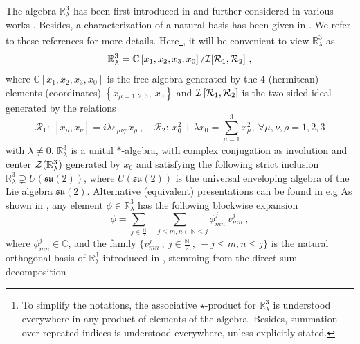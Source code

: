 \documentclass[10pt]{book}
\theoremstyle{break}
\begin{document}
The algebra $\mathbb{R}^3_\lambda$ has been first introduced in %
and further considered in various works %
. Besides, a characterization of a natural basis has been given in %
. We refer to these references for more details. Here{\footnote{To simplify the notations, the associative $\star$-product for $\mathbb{R}^3_\lambda$ is understood everywhere in any product of elements of the algebra. Besides, summation over repeated indices is understood everywhere, unless explicitly stated.}}, it will be convenient to view $\mathbb{R}^3_\lambda$ as %
%
\begin{equation}
\mathbb{R}^3_\lambda=\mathbb{C}\left[x_1,x_2,x_3,x_0\right]/{\mathcal{I}}[{\mathcal{R}}_1,{\cal{R}}_2] \ , %
\end{equation}
%
where $\mathbb{C}\left[x_1,x_2,x_3,x_0\right]$ is the free algebra generated by the 4 (hermitean) elements (coordinates) $\left\{x_{\mu=1,2,3},\ x_0\right\}$ and ${\mathcal{I}}\left[{\mathcal{R}}_1,{\cal{R}}_2\right]$ is the two-sided ideal generated by the relations%
%
\begin{equation}
{\mathcal{R}}_1: \ [x_\mu,x_\nu] = i \lambda \varepsilon_{\mu\nu\rho} x_\rho \ , \quad
{\mathcal{R}}_2: \ x_0^2 + \lambda x_0 = \sum_{\mu=1}^3 x_\mu^2,\ \forall \mu,\nu,\rho=1,2,3%
\end{equation}
%
with $\lambda\ne0$. $\mathbb{R}^3_\lambda$ is a unital $*$-algebra, with complex conjugation as involution and center ${\cal{Z}}(\mathbb{R}^3_\lambda)$ generated by $x_0$ and satisfying the following strict inclusion $\mathbb{R}^3_\lambda\supsetneq U(\mathfrak{su}(2))$, where $U(\mathfrak{su}(2))$ is the universal enveloping algebra of the Lie algebra ${\mathfrak{su}}(2)$. Alternative (equivalent) presentations can be found in e.g %
%
As shown in %
, any element $\phi\in\mathbb{R}^3_\lambda$ has the following blockwise expansion%
%
\begin{equation}
\phi = \sum_{j\in\frac{\mathbb{N}}{2}} \ \sum_{-j\le m,n\in\mathbb{N}\le j} \phi^j_{mn} \ v^j_{mn} \ , %
\end{equation}
%
where $\phi^j_{mn}\in\mathbb{C}$, and the family $\{v^j_{mn} \ , \ j\in\frac{\mathbb{N}}{2} \ ,\ -j\le m,n\le j\}$ is the natural orthogonal basis of $\mathbb{R}^3_\lambda$ introduced in %
, stemming from the direct sum decomposition%
\end{document}
